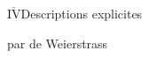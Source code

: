 \uline{$\overline{\mathrm{IV}}$}\quad Descriptions explicites

par  \inserted{$\wp$} de Weierstrass
